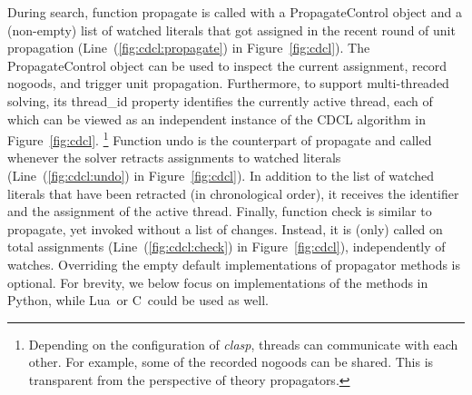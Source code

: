 \documentclass[a4paper,USenglish]{oasics-v2016}
\newcommand{\code}[1]{{\ttfamily #1}}
\newcommand{\codeClass}[2]{\code{#2}}
\newcommand{\sysfont}{\textit}
\newcommand{\clasp}{\sysfont{clasp}}
\newcommand{\python}{Python}
\newcommand{\lua}{Lua}
\newcommand{\C}{C}
\begin{document}
During search, function \codeClass{Propagator}{propagate} is called with a \code{PropagateControl} object
and a (non-empty) list of watched literals that got assigned in the recent round of unit propagation (Line~(\ref{fig:cdcl:propagate}) in Figure~\ref{fig:cdcl}).
The \code{PropagateControl} object can be used to inspect the current assignment, record nogoods, and trigger unit propagation.
Furthermore, to support multi-threaded solving,
its \code{thread\_id} property identifies the currently active thread,
each of which can be viewed as an independent instance of the CDCL algorithm in Figure~\ref{fig:cdcl}.%
%
\footnote{%
Depending on the configuration of \clasp, threads can communicate with each other.
For example, some of the recorded nogoods can be shared.
This is transparent from the perspective of theory propagators.}
%
Function \codeClass{Propagator}{undo} is the counterpart of \codeClass{Propagator}{propagate}
and called whenever the solver retracts assignments to watched literals (Line~(\ref{fig:cdcl:undo}) in Figure~\ref{fig:cdcl}).
In addition to the list of watched literals that have been retracted (in chronological order),
it receives the identifier and the assignment of the active thread.
%
Finally, function \codeClass{Propagator}{check} is similar to \codeClass{Propagator}{propagate},
yet invoked without a list of changes.
Instead, it is (only) called on total assignments
(Line~(\ref{fig:cdcl:check}) in Figure~\ref{fig:cdcl}), independently of watches.
%
Overriding the empty default implementations of propagator methods is optional.
%
For brevity, we below focus on implementations of the methods in \python,
while \lua\ or \C\ could be used as well.
\end{document}
